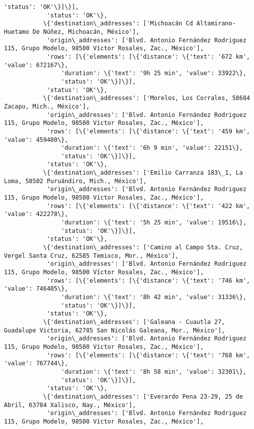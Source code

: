 \documentclass[11pt]{article}
\begin{document}
\begin{Verbatim}[commandchars=\\\{\}]
                'status': 'OK'\}]\}],
            'status': 'OK'\},
           \{'destination\_addresses': ['Michoacán Cd Altamirano-Huetamo De Núñez, Michoacán, México'],
            'origin\_addresses': ['Blvd. Antonio Fernández Rodriguez 115, Grupo Modelo, 98500 Víctor Rosales, Zac., México'],
            'rows': [\{'elements': [\{'distance': \{'text': '672 km', 'value': 672167\},
                'duration': \{'text': '9h 25 min', 'value': 33922\},
                'status': 'OK'\}]\}],
            'status': 'OK'\},
           \{'destination\_addresses': ['Morelos, Los Corrales, 58684 Zacapu, Mich., México'],
            'origin\_addresses': ['Blvd. Antonio Fernández Rodriguez 115, Grupo Modelo, 98500 Víctor Rosales, Zac., México'],
            'rows': [\{'elements': [\{'distance': \{'text': '459 km', 'value': 459480\},
                'duration': \{'text': '6h 9 min', 'value': 22151\},
                'status': 'OK'\}]\}],
            'status': 'OK'\},
           \{'destination\_addresses': ['Emilio Carranza 183\_1, La Loma, 58502 Puruándiro, Mich., México'],
            'origin\_addresses': ['Blvd. Antonio Fernández Rodriguez 115, Grupo Modelo, 98500 Víctor Rosales, Zac., México'],
            'rows': [\{'elements': [\{'distance': \{'text': '422 km', 'value': 422278\},
                'duration': \{'text': '5h 25 min', 'value': 19516\},
                'status': 'OK'\}]\}],
            'status': 'OK'\},
           \{'destination\_addresses': ['Camino al Campo Sta. Cruz, Vergel Santa Cruz, 62585 Temixco, Mor., México'],
            'origin\_addresses': ['Blvd. Antonio Fernández Rodriguez 115, Grupo Modelo, 98500 Víctor Rosales, Zac., México'],
            'rows': [\{'elements': [\{'distance': \{'text': '746 km', 'value': 746405\},
                'duration': \{'text': '8h 42 min', 'value': 31336\},
                'status': 'OK'\}]\}],
            'status': 'OK'\},
           \{'destination\_addresses': ['Galeana - Cuautla 27, Guadalupe Victoria, 62785 San Nicolás Galeana, Mor., México'],
            'origin\_addresses': ['Blvd. Antonio Fernández Rodriguez 115, Grupo Modelo, 98500 Víctor Rosales, Zac., México'],
            'rows': [\{'elements': [\{'distance': \{'text': '768 km', 'value': 767744\},
                'duration': \{'text': '8h 58 min', 'value': 32301\},
                'status': 'OK'\}]\}],
            'status': 'OK'\},
           \{'destination\_addresses': ['Everardo Pena 23-29, 25 de Abril, 63784 Xalisco, Nay., México'],
            'origin\_addresses': ['Blvd. Antonio Fernández Rodriguez 115, Grupo Modelo, 98500 Víctor Rosales, Zac., México'],

\end{Verbatim}
\end{document}
